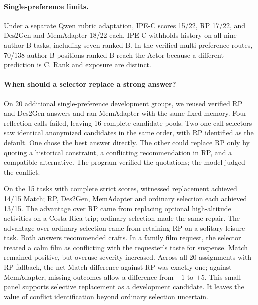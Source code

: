 \documentclass[11pt]{article}
\begin{document}
\paragraph{Single-preference limits.}
Under a separate Qwen rubric adaptation, IPE-C scores 15/22, RP 17/22, and Des2Gen and MemAdapter 18/22 each. IPE-C withholds history on all nine author-B tasks, including seven ranked B. In the verified multi-preference routes, 70/138 author-B positions ranked B reach the Actor because a different prediction is C. Rank and exposure are distinct.

\paragraph{When should a selector replace a strong answer?}
On 20 additional single-preference development groups, we reused verified RP and Des2Gen answers and ran MemAdapter with the same fixed memory. Four reflection calls failed, leaving 16 complete candidate pools. Two one-call selectors saw identical anonymized candidates in the same order, with RP identified as the default. One chose the best answer directly. The other could replace RP only by quoting a historical constraint, a conflicting recommendation in RP, and a compatible alternative. The program verified the quotations; the model judged the conflict.

On the 15 tasks with complete strict scores, witnessed replacement achieved 14/15 Match; RP, Des2Gen, MemAdapter and ordinary selection each achieved 13/15. The advantage over RP came from replacing optional high-altitude activities on a Costa Rica trip; ordinary selection made the same repair. The advantage over ordinary selection came from retaining RP on a solitary-leisure task. Both answers recommended crafts. In a family film request, the selector treated a calm film as conflicting with the requester's taste for suspense. Match remained positive, but overuse severity increased. Across all 20 assignments with RP fallback, the net Match difference against RP was exactly one; against MemAdapter, missing outcomes allow a difference from $-1$ to $+5$. This small panel supports selective replacement as a development candidate. It leaves the value of conflict identification beyond ordinary selection uncertain.
\end{document}
